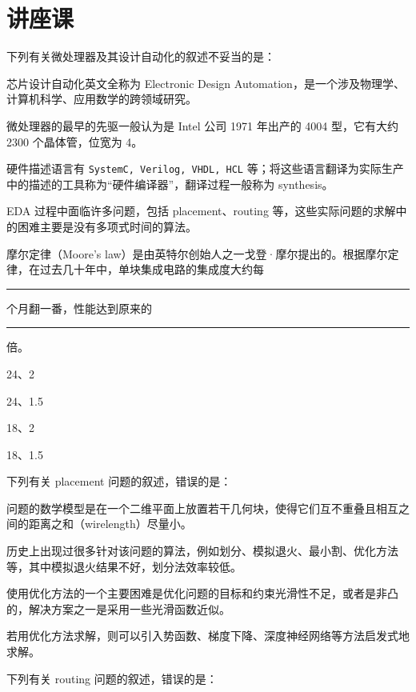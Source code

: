 \chapter{讲座课}\thispagestyle{empty}
    \begin{problems}
        \pro 下列有关微处理器及其设计自动化的叙述不妥当的是：
        \begin{choices}
            \item 芯片设计自动化英文全称为 Electronic Design Automation，是一个涉及物理学、计算机科学、应用数学的跨领域研究。
            \item 微处理器的最早的先驱一般认为是 Intel 公司 1971 年出产的 4004 型，它有大约 2300 个晶体管，位宽为 4。
            \item 硬件描述语言有 \verb|SystemC, Verilog, VHDL, HCL| 等；将这些语言翻译为实际生产中的描述的工具称为“硬件编译器”，翻译过程一般称为 synthesis。
            \item EDA 过程中面临许多问题，包括 placement、routing 等，这些实际问题的求解中的困难主要是没有多项式时间的算法。
        \end{choices}
        \pro 摩尔定律（Moore's law）是由英特尔创始人之一戈登·摩尔提出的。根据摩尔定律，在过去几十年中，单块集成电路的集成度大约每 \rule{1cm}{0.25mm} 个月翻一番，性能达到原来的 \rule{1cm}{0.25mm} 倍。
        \begin{choices}
            \item 24、2
            \item 24、1.5
            \item 18、2
            \item 18、1.5
        \end{choices}
        \pro 下列有关 placement 问题的叙述，错误的是：
        \begin{choices}
            \item 问题的数学模型是在一个二维平面上放置若干几何块，使得它们互不重叠且相互之间的距离之和（wirelength）尽量小。
            \item 历史上出现过很多针对该问题的算法，例如划分、模拟退火、最小割、优化方法等，其中模拟退火结果不好，划分法效率较低。
            \item 使用优化方法的一个主要困难是优化问题的目标和约束光滑性不足，或者是非凸的，解决方案之一是采用一些光滑函数近似。
            \item 若用优化方法求解，则可以引入势函数、梯度下降、深度神经网络等方法启发式地求解。
        \end{choices}
        \pro 下列有关 routing 问题的叙述，错误的是：
        \begin{choices}

\end{choices}
\end{problems}
